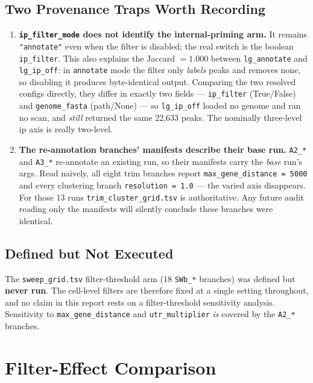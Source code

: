 \documentclass[11pt,a4paper]{article}
\begin{document}
\subsection{Two Provenance Traps Worth Recording}

\begin{enumerate}
  \item \textbf{\texttt{ip\_filter\_mode} does not identify the internal-priming
    arm.} It remains \texttt{"annotate"} even when the filter is disabled; the
    real switch is the boolean \texttt{ip\_filter}. This also explains the
    Jaccard $= 1.000$ between \texttt{lg\_annotate} and \texttt{lg\_ip\_off}: in
    \texttt{annotate} mode the filter only \emph{labels} peaks and removes none,
    so disabling it produces byte-identical output. Comparing the two resolved
    configs directly, they differ in exactly two fields --- \texttt{ip\_filter}
    (True/False) and \texttt{genome\_fasta} (path/None) --- so \texttt{lg\_ip\_off}
    loaded no genome and ran no scan, and \emph{still} returned the same 22,633
    peaks. The nominally three-level ip axis is really two-level.
  \item \textbf{The re-annotation branches' manifests describe their base run.}
    \texttt{A2\_*} and \texttt{A3\_*} re-annotate an existing run, so their
    manifests carry the \emph{base} run's args. Read naively, all eight trim
    branches report \texttt{max\_gene\_distance = 5000} and every clustering
    branch \texttt{resolution = 1.0} --- the varied axis disappears. For those 13
    runs \texttt{trim\_cluster\_grid.tsv} is authoritative. Any future audit
    reading only the manifests will silently conclude these branches were
    identical.
\end{enumerate}

\subsection{Defined but Not Executed}

The \texttt{sweep\_grid.tsv} filter-threshold arm (18 \texttt{SWb\_*} branches)
was defined but \textbf{never run}. The cell-level filters are therefore fixed at
a single setting throughout, and no claim in this report rests on a
filter-threshold sensitivity analysis. Sensitivity to \texttt{max\_gene\_distance}
and \texttt{utr\_multiplier} \emph{is} covered by the \texttt{A2\_*} branches.

\section{Filter-Effect Comparison}
\label{sec:filter_effect}
\end{document}
